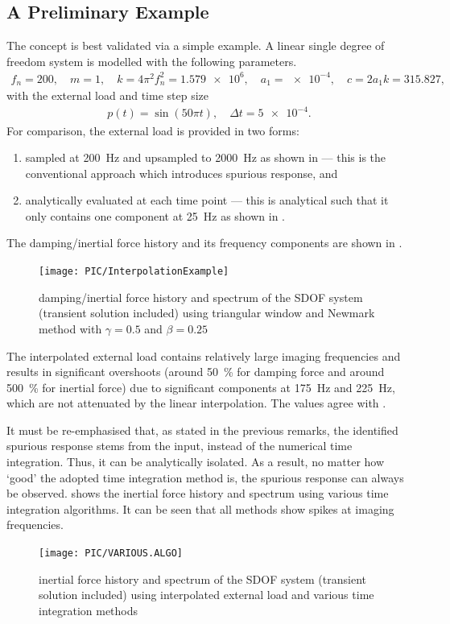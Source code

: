 \subsection{A Preliminary Example}\label{sec:sdof_example}
The concept is best validated via a simple example. A linear single degree of freedom system is modelled with the following parameters.
\begin{gather}
f_n=200,\quad{}m=1,\quad{}k=4\pi^2f_n^2=\num{1.579e6},\quad{}a_1=\num{e-4},\quad{}c=2a_1k=\num{315.827},
\end{gather}
with the external load and time step size
\begin{gather}
p\left(t\right)=\sin\left(50\pi{}t\right),\quad\Delta{}t=\num{5e-4}.
\end{gather}
For comparison, the external load is provided in two forms:
\begin{enumerate}
\item sampled at \SI{200}{\hertz} and upsampled to \SI{2000}{\hertz} as shown in  --- this is the conventional approach which introduces spurious response, and
\item analytically evaluated at each time point --- this is analytical such that it only contains one component at \SI{25}{\hertz} as shown in .
\end{enumerate}
The damping/inertial force history and its frequency components are shown in .
\begin{figure}[htb!]
\centering
\texttt{[image: PIC/InterpolationExample]}
\caption{damping/inertial force history and spectrum of the SDOF system (transient solution included) using triangular window and Newmark method with $\gamma=0.5$ and $\beta=0.25$}\label{fig:sdof_force}
\end{figure}
The interpolated external load contains relatively large imaging frequencies and results in significant overshoots (around \SI{50}{\percent} for damping force and around \SI{500}{\percent} for inertial force) due to significant components at \SI{175}{\hertz} and \SI{225}{\hertz}, which are not attenuated by the linear interpolation. The values agree with .

It must be re-emphasised that, as stated in the previous remarks, the identified spurious response stems from the input, instead of the numerical time integration. Thus, it can be analytically isolated. As a result, no matter how `good' the adopted time integration method is, the spurious response can always be observed.  shows the inertial force history and spectrum using various time integration algorithms. It can be seen that all methods show spikes at imaging frequencies.
\begin{figure}[htb!]
\centering
\texttt{[image: PIC/VARIOUS.ALGO]}
\caption{inertial force history and spectrum of the SDOF system (transient solution included) using interpolated external load and various time integration methods}\label{fig:sdof_various}
\end{figure}

